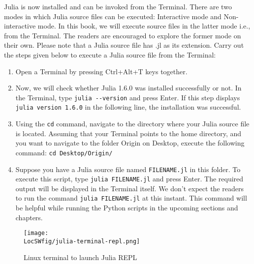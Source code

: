 Julia is now installed and can be invoked from the Terminal. There are two modes in which Julia 
source files can be executed: Interactive mode and Non-interactive mode. In this book, 
we will execute source files in the latter mode i.e., from the Terminal. The readers are encouraged to explore
the former mode on their own. Please note that a Julia source file has .jl
as its extension. Carry out the steps given below to execute a Julia source file from
the Terminal: 
\begin{enumerate}
      \item Open a Terminal by pressing Ctrl+Alt+T keys together.
      \item Now, we will check whether Julia 1.6.0 was installed successfully or not. 
      In the Terminal, type {\tt julia -{}-version} and press Enter. 
      If this step displays {\tt julia version 1.6.0} in the following line, the installation was successful.
      \item Using the {\tt cd} command, navigate to the directory where your Julia source file is located. 
      Assuming that your Terminal points to the 
      home directory, and you want to navigate to the folder Origin on 
      Desktop, execute the following command: {\tt cd Desktop/Origin/}
      \item Suppose you have a Julia source file named {\tt FILENAME.jl} in this 
      folder. To execute this script, type {\tt julia FILENAME.jl} and press 
      Enter. The required output will be displayed in the Terminal itself. 
      We don't expect the readers to run the command {\tt julia FILENAME.jl} at 
      this instant. This command will be helpful while running the Python 
      scripts in the upcoming sections and chapters. 
\end{enumerate}

\begin{figure}
      \centering
      \texttt{[image: \\LocSWfig/julia-terminal-repl.png]}
      \caption{Linux terminal to launch Julia REPL}
      \label{julia-repl}
\end{figure}


